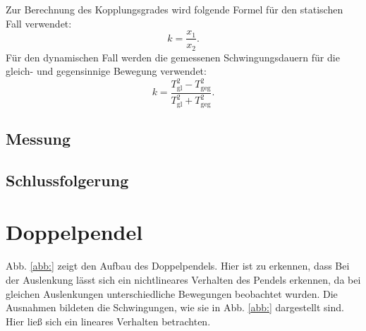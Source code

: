 \documentclass[11pt,a4paper,titlepage, ngerman]{article}
\newcommand{\refabb}[1]{Abb. \ref{abb:#1}}
\begin{document}
			Zur Berechnung des Kopplungsgrades wird folgende Formel für den statischen Fall verwendet: 
			\begin{equation}
				k = \frac{x_1}{x_2}.
			\end{equation}
			Für den dynamischen Fall werden die gemessenen Schwingungsdauern für die gleich- und gegensinnige Bewegung verwendet:
			\begin{equation}
			k = \frac{T_\text{gl}^2-T_\text{geg}^2}{T_\text{gl}^2+T_\text{geg}^2}.
			\end{equation}
		\subsection{Messung}
			
			
		\subsection{Schlussfolgerung}
							
				
	\section{Doppelpendel}
				
		\refabb{} zeigt den Aufbau des Doppelpendels. Hier ist zu erkennen, dass 
		Bei der Auslenkung lässt sich ein nichtlineares Verhalten des Pendels erkennen, da bei gleichen Auslenkungen unterschiedliche Bewegungen beobachtet wurden. 
		Die Ausnahmen bildeten die Schwingungen, wie sie in \refabb{} dargestellt sind. Hier ließ sich ein lineares Verhalten betrachten.
		
\end{document}
